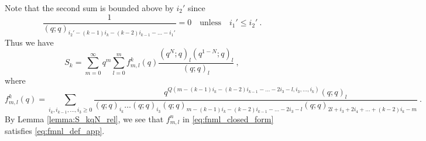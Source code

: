 \documentclass[a4paper,10pt]{article}
\begin{document}
\begin{appendix}
Note that the second sum is bounded above by $i_2'$ since 
\begin{equation}
    \frac{1}{(q;q)_{i_2'-(k-1)i_k-(k-2)i_{k-1}-\dots-i_1'}}=0\quad\text{unless}\quad i_1'\leq i_2'~.
\end{equation}
Thus we have 
\begin{equation}
    S_k=\sum_{m=0}^\infty q^{m}\sum_{l= 0}^{m}f^k_{m,l}(q)\frac{(q^N;q)_{l}(q^{1-N};q)_{l}}{(q;q)_{l}}~,
\end{equation}
where 
\begin{equation}\label{eq:fnml_closed_form}
f^k_{m,l}(q)=\sum_{i_k,i_{k-1},\dots,i_3\geq 0}\frac{q^{Q(m-(k-1)i_k-(k-2)i_{k-1}-\dots-2i_3-l,i_3,\dots,i_k)}(q;q)_{l}}{(q;q)_{i_k}\dots (q;q)_{i_3}(q;q)_{m-(k-1)i_k-(k-2)i_{k-1}-\dots-2i_3-l}(q;q)_{2l+i_3+2i_4+\dots+(k-2)i_k-m}}~.    
\end{equation}
By Lemma \ref{lemma:S_kqN_rel}, we see that $f^n_{m,l}$ in \eqref{eq:fnml_closed_form} satisfies \eqref{eq:fmnl_def_app}. 

\end{appendix}
\end{document}
